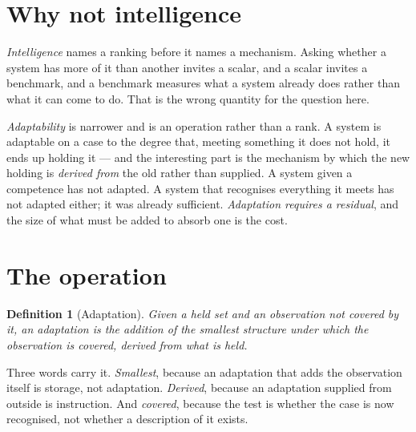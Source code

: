 \documentclass[11pt,a4paper]{article}
\newtheorem{definition}{Definition}[section]
\theoremstyle{remark}
\begin{document}
\section{Why not intelligence}\label{sec:not-intelligence}
\emph{Intelligence} names a ranking before it names a mechanism. Asking whether a system has more of it
than another invites a scalar, and a scalar invites a benchmark, and a benchmark measures what a system
already does rather than what it can come to do. That is the wrong quantity for the question here.

\emph{Adaptability} is narrower and is an operation rather than a rank. A system is adaptable on a case
to the degree that, meeting something it does not hold, it ends up holding it --- and the interesting
part is the mechanism by which the new holding is \emph{derived from} the old rather than supplied. A
system given a competence has not adapted. A system that recognises everything it meets has not adapted
either; it was already sufficient. \emph{Adaptation requires a residual}, and the size of what must be
added to absorb one is the cost.

\section{The operation}\label{sec:operation}
\begin{definition}[Adaptation]\label{def:adapt}
Given a held set and an observation not covered by it, an \emph{adaptation} is the addition of the
smallest structure under which the observation is covered, derived from what is held.
\end{definition}

Three words carry it. \emph{Smallest}, because an adaptation that adds the observation itself is
storage, not adaptation. \emph{Derived}, because an adaptation supplied from outside is instruction.
And \emph{covered}, because the test is whether the case is now recognised, not whether a description
of it exists.
\end{document}
